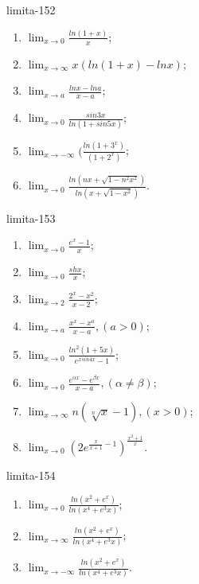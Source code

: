 \begin{defproblem}{limita-152}
\begin{multicols}{2}
\begin{enumerate}
    \item $\lim_{{x \rightarrow 0}} \frac{ln(1+x)}{x}$;
    \item $\lim_{{x \rightarrow \infty}} x(ln(1+x)-ln x)$;
    \item $\lim_{{x \rightarrow a}} \frac{ln x - ln a}{x-a}$;
    \item $\lim_{{x \rightarrow 0}} \frac{sin 3x}{ln(1+sin 5x)}$;
    \item $\lim_{{x \rightarrow -\infty}} (\frac{ln (1+3^x)}{(1+2^x)}$;
    \item $\lim_{{x \rightarrow 0}} \frac{ln(nx+\sqrt{1-n^2x^2})}{ln(x+\sqrt{1-x^2})}$.
\end{enumerate}
\end{multicols}
\end{defproblem}

\begin{defproblem}{limita-153}
\begin{multicols}{2}
\begin{enumerate}
    \item $\lim_{{x \rightarrow 0}} \frac{e^x-1}{x}$;
    \item $\lim_{{x \rightarrow 0}} \frac{sh x}{x}$;
    \item $\lim_{{x \rightarrow 2}} \frac{2^x-x^2}{x-2}$;
    \item $\lim_{{x \rightarrow a}} \frac{x^x-x^a}{x-a},(a>0)$;
    \item $\lim_{{x \rightarrow 0}} \frac{ln^2 (1+5x)}{e^{x sin 4x}-1}$;
    \item $\lim_{{x \rightarrow 0}} \frac{e^{\alpha x}-e^{\beta x}}{x-a},(\alpha \neq \beta)$;
    \item $\lim_{{x \rightarrow \infty}}n(\sqrt[n]{x}-1),(x>0)$;
    \item $\lim_{{x \rightarrow 0}} ({2e^{\frac{x}{x+1}-1}})^{\frac{x^2+1}{x}}$.
\end{enumerate}
\end{multicols}
\end{defproblem}

\begin{defproblem}{limita-154}
\begin{multicols}{2}
\begin{enumerate}
    \item $\lim_{{x \rightarrow 0}} \frac{ln(x^2+e^x)}{ln(x^4+e^3x)}$;
    \item $\lim_{{x \rightarrow \infty}} \frac{ln(x^2+e^x)}{ln(x^4+e^3x)}$;
    \item $\lim_{{x \rightarrow -\infty}} \frac{ln(x^2+e^x)}{ln(x^4+e^3x)}$.
\end{enumerate}
\end{multicols}
\end{defproblem}

